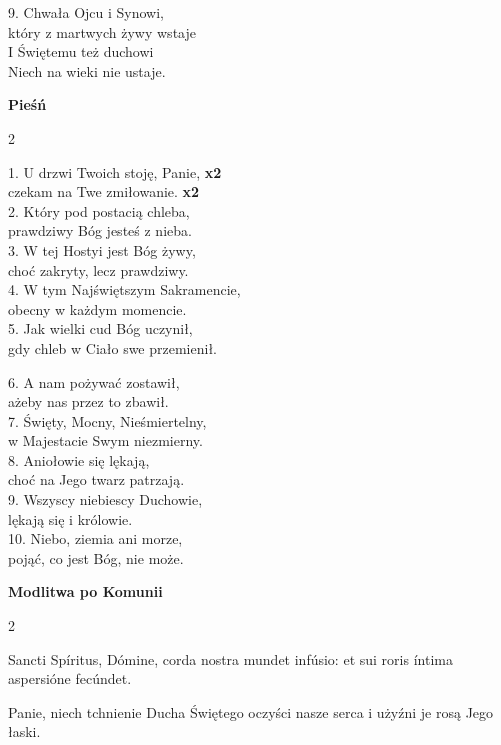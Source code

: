 \documentclass[10pt,a5paper]{book}
\newcommand{\oremus}[3]{\medskip\centerline{\textbf{#1}}\medskip
	\begin{sloppypar}
		\begin{paracol}{2}
			\setlength{\columnsep}{0em}
			\begin{leftcolumn}
				#2
			\end{leftcolumn}
			\begin{rightcolumn}
				#3
			\end{rightcolumn}
		\end{paracol}
	\end{sloppypar}}
\begin{document}
						\begin{center}		
							9. Chwała Ojcu i Synowi, \\
							który z martwych żywy wstaje\\
							I Świętemu też duchowi \\
							Niech na wieki nie ustaje. \\ 
						\end{center}
					
					\oremus{Pieśń}{
						1. U drzwi Twoich stoję, Panie, \textbf{x2}\\
						czekam na Twe zmiłowanie. \textbf{x2} \\
						
						2. Który pod postacią chleba, \\
						prawdziwy Bóg jesteś z nieba.\\
						
						3. W tej Hostyi jest Bóg żywy, \\
						choć zakryty, lecz prawdziwy.\\
						
						4. W tym Najświętszym Sakramencie, \\
						obecny w każdym momencie.\\
						
						5. Jak wielki cud Bóg uczynił, \\
						gdy chleb w Ciało swe przemienił.}{
						6. A nam pożywać zostawił, \\
						ażeby nas przez to zbawił.\\
						
						7. Święty, Mocny, Nieśmiertelny, \\
						w Majestacie Swym niezmierny.\\
						
						8. Aniołowie się lękają, \\
						choć na Jego twarz patrzają.\\
						
						9. Wszyscy niebiescy Duchowie, \\
						lękają się i królowie.\\
						
						10. Niebo, ziemia ani morze, \\
						pojąć, co jest Bóg, nie może.}
					
					\newpage
					
					\oremus{Modlitwa po Komunii}{
						Sancti Spíritus, Dómine, corda nostra mundet infúsio: et sui roris íntima aspersióne fecúndet.}{
						Panie, niech tchnienie Ducha Świętego oczyści nasze serca i użyźni je rosą Jego łaski.}
					
\end{document}
